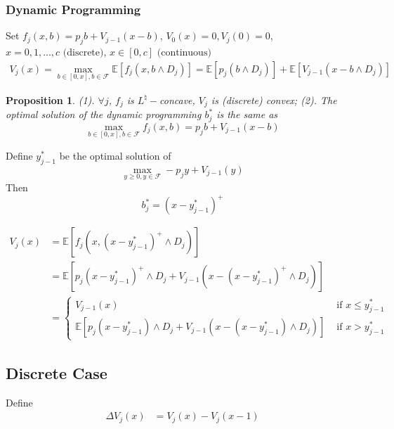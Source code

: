 \documentclass[11pt,a4paper]{article}
\newtheorem{proposition}{Proposition}
\begin{document}
\subsubsection{Dynamic Programming}
Set $f_j(x,b)=p_j b+V_{j-1}(x-b)$, $V_0(x)=0, V_j(0)=0$, $x=0,1,...,c\text{ (discrete)}$, $x\in[0,c]\text{ (continuous)}$
\begin{equation}
    \begin{aligned}
        V_j(x)=\max_{b\in[0,x],b\in \mathcal{F}} \mathbb{E}[f_j(x,b\wedge D_j)]
        =\mathbb{E}[p_j (b\wedge D_j)]+\mathbb{E}[V_{j-1}(x-b\wedge D_j)]
    \end{aligned}
    \nonumber
\end{equation}
\begin{proposition}
(1). $\forall j$, $f_j$ is $L^\natural-$concave, $V_j$ is (discrete) convex; (2). The optimal solution of the dynamic programming $b_j^*$ is the same as $$\max_{b\in[0,x],b\in \mathcal{F}} f_j(x,b)=p_j b+V_{j-1}(x-b)$$
\end{proposition}
Define $y^*_{j-1}$ be the optimal solution of
$$\max_{y\geq 0,y\in \mathcal{F}} -p_j y+V_{j-1}(y)$$
Then $$b_j^*=(x-y_{j-1}^*)^+$$

\begin{equation}
    \begin{aligned}
        V_j(x)&=\mathbb{E}[f_j(x,(x-y_{j-1}^*)^+\wedge D_j)]\\
        &=\mathbb{E}[p_j(x-y_{j-1}^*)^+\wedge D_j+V_{j-1}(x-(x-y_{j-1}^*)^+\wedge D_j)]\\
        &=\left\{\begin{matrix}
            V_{j-1}(x)&\text{ if }x\leq y_{j-1}^*\\
            \mathbb{E}[p_j(x-y_{j-1}^*)\wedge D_j+V_{j-1}(x-(x-y_{j-1}^*)\wedge D_j)]&\text{ if }x> y_{j-1}^*
        \end{matrix}\right.
    \end{aligned}
    \nonumber
\end{equation}

\subsection{Discrete Case}
Define
\begin{equation}
    \begin{aligned}
        \Delta V_j(x)&=V_j(x)-V_j(x-1)
    \end{aligned}
    \nonumber
\end{equation}
\end{document}
